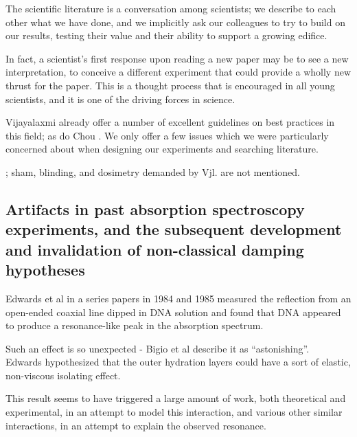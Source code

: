 \documentclass[paper.tex]{subfiles}
\begin{document}
\begin{fquote}
	The scientific literature is a conversation among scientists; we describe to each other what we have done, and we implicitly ask our colleagues to try to build on our results, testing their value and their ability to support a growing edifice.
	
	In fact, a scientist's first response upon reading a new paper may be to see a new interpretation, to conceive a different experiment that could provide a wholly new thrust for the paper. This is a thought process that is encouraged in all young scientists, and it is one of the driving forces in science.
\end{fquote}



\begin{multicols}{1}

Vijayalaxmi \cite{Biological2016} \cite{Comprehensive2018} \cite{Funding2019} already offer a number of excellent guidelines on best practices in this field; as do Chou \cite{chou1996radio}. We only offer a few issues which we were particularly concerned about when designing our experiments and searching literature. 

; sham, blinding, and dosimetry demanded by Vjl. are not mentioned.


\subsection{Artifacts in past absorption spectroscopy experiments, and the subsequent development and invalidation of non-classical damping hypotheses}

Edwards et al in a series papers in 1984 and 1985 measured the reflection from an open-ended coaxial line dipped in DNA solution and found that DNA appeared to produce a resonance-like peak in the absorption spectrum.

Such an effect is so unexpected - Bigio et al describe it as “astonishing”. \\

Edwards hypothesized that the outer hydration layers could have a sort of elastic, non-viscous isolating effect.

This result seems to have triggered a large amount of work, both theoretical and experimental\cite{Structure1989}, in an attempt to model this interaction, and various other similar interactions, in an attempt to explain the observed resonance.


\end{multicols}
\end{document}

